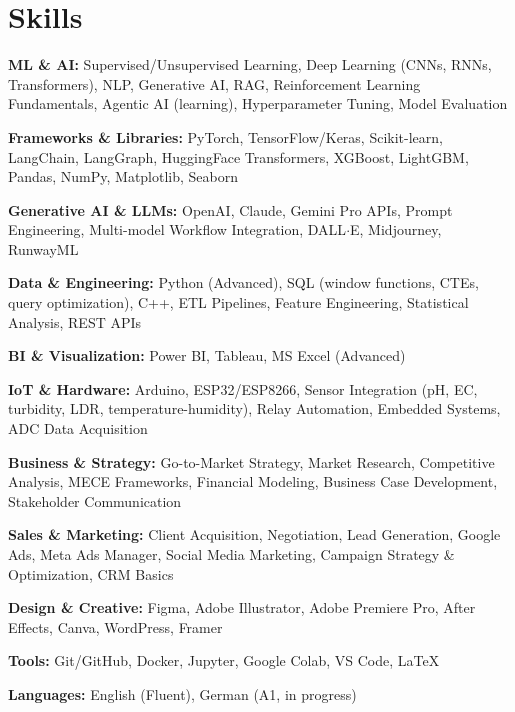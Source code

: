 \documentclass[letterpaper,10.5pt]{article}
\begin{document}
\section{Skills}
\begin{itemize}[leftmargin=0.12in, label={}, itemsep=1pt, parsep=0pt]
  \small{
    \item \textbf{ML \& AI:} Supervised/Unsupervised Learning, Deep Learning (CNNs, RNNs, Transformers), NLP, Generative AI, RAG, Reinforcement Learning Fundamentals, Agentic AI (learning), Hyperparameter Tuning, Model Evaluation
    \item \textbf{Frameworks \& Libraries:} PyTorch, TensorFlow/Keras, Scikit-learn, LangChain, LangGraph, HuggingFace Transformers, XGBoost, LightGBM, Pandas, NumPy, Matplotlib, Seaborn
    \item \textbf{Generative AI \& LLMs:} OpenAI, Claude, Gemini Pro APIs, Prompt Engineering, Multi-model Workflow Integration, DALL$\cdot$E, Midjourney, RunwayML
    \item \textbf{Data \& Engineering:} Python (Advanced), SQL (window functions, CTEs, query optimization), C++, ETL Pipelines, Feature Engineering, Statistical Analysis, REST APIs
    \item \textbf{BI \& Visualization:} Power BI, Tableau, MS Excel (Advanced)
    \item \textbf{IoT \& Hardware:} Arduino, ESP32/ESP8266, Sensor Integration (pH, EC, turbidity, LDR, temperature-humidity), Relay Automation, Embedded Systems, ADC Data Acquisition
    \item \textbf{Business \& Strategy:} Go-to-Market Strategy, Market Research, Competitive Analysis, MECE Frameworks, Financial Modeling, Business Case Development, Stakeholder Communication
    \item \textbf{Sales \& Marketing:} Client Acquisition, Negotiation, Lead Generation, Google Ads, Meta Ads Manager, Social Media Marketing, Campaign Strategy \& Optimization, CRM Basics
    \item \textbf{Design \& Creative:} Figma, Adobe Illustrator, Adobe Premiere Pro, After Effects, Canva, WordPress, Framer
    \item \textbf{Tools:} Git/GitHub, Docker, Jupyter, Google Colab, VS Code, LaTeX
    \item \textbf{Languages:} English (Fluent), German (A1, in progress)
  }
\end{itemize}
\vspace{-6pt}

\end{document}
